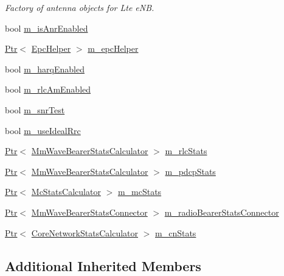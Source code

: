 \begin{DoxyCompactItemize}
\begin{DoxyCompactList}\small\item\em Factory of antenna objects for Lte e\+NB. \end{DoxyCompactList}\item 
bool \hyperlink{classns3_1_1MmWaveHelper_aca7f0b0f8f8f2898ac833811221d056d}{m\+\_\+is\+Anr\+Enabled}
\item 
\hyperlink{classns3_1_1Ptr}{Ptr}$<$ \hyperlink{classns3_1_1EpcHelper}{Epc\+Helper} $>$ \hyperlink{classns3_1_1MmWaveHelper_a03b33f9a2480a4cdd8ffe697ccc08e9e}{m\+\_\+epc\+Helper}
\item 
bool \hyperlink{classns3_1_1MmWaveHelper_a56142ee76b853ab0fa13918aeb6800e9}{m\+\_\+harq\+Enabled}
\item 
bool \hyperlink{classns3_1_1MmWaveHelper_a47e5d8166922f0be28d1e29e18d2e1f9}{m\+\_\+rlc\+Am\+Enabled}
\item 
bool \hyperlink{classns3_1_1MmWaveHelper_a8e31c7897807a6d5e9b7acd29cccaf01}{m\+\_\+snr\+Test}
\item 
bool \hyperlink{classns3_1_1MmWaveHelper_ad41fdb2996a6f53385b146bb60f476dc}{m\+\_\+use\+Ideal\+Rrc}
\item 
\hyperlink{classns3_1_1Ptr}{Ptr}$<$ \hyperlink{classns3_1_1MmWaveBearerStatsCalculator}{Mm\+Wave\+Bearer\+Stats\+Calculator} $>$ \hyperlink{classns3_1_1MmWaveHelper_abcf15ea429f42e33fe9099c36e98fb52}{m\+\_\+rlc\+Stats}
\item 
\hyperlink{classns3_1_1Ptr}{Ptr}$<$ \hyperlink{classns3_1_1MmWaveBearerStatsCalculator}{Mm\+Wave\+Bearer\+Stats\+Calculator} $>$ \hyperlink{classns3_1_1MmWaveHelper_a1cf35c3b088c28c3b2ab7447753418a1}{m\+\_\+pdcp\+Stats}
\item 
\hyperlink{classns3_1_1Ptr}{Ptr}$<$ \hyperlink{classns3_1_1McStatsCalculator}{Mc\+Stats\+Calculator} $>$ \hyperlink{classns3_1_1MmWaveHelper_a95f22a21bfca59d953c32a08431b616b}{m\+\_\+mc\+Stats}
\item 
\hyperlink{classns3_1_1Ptr}{Ptr}$<$ \hyperlink{classns3_1_1MmWaveBearerStatsConnector}{Mm\+Wave\+Bearer\+Stats\+Connector} $>$ \hyperlink{classns3_1_1MmWaveHelper_ad5ffe8dabdf448f8b8ccfa2451b04f35}{m\+\_\+radio\+Bearer\+Stats\+Connector}
\item 
\hyperlink{classns3_1_1Ptr}{Ptr}$<$ \hyperlink{classns3_1_1CoreNetworkStatsCalculator}{Core\+Network\+Stats\+Calculator} $>$ \hyperlink{classns3_1_1MmWaveHelper_a87bf8cd5b307fe0037ddf510920211dd}{m\+\_\+cn\+Stats}
\end{DoxyCompactItemize}
\subsection*{Additional Inherited Members}


